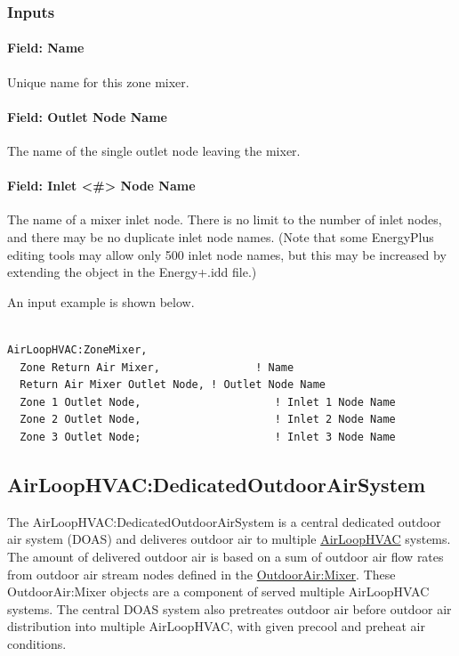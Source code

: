 \subsubsection{Inputs}\label{inputs-5-002}

\paragraph{Field: Name}\label{field-name-5-002}

Unique name for this zone mixer.

\paragraph{Field: Outlet Node Name}\label{field-outlet-node-name-3}

The name of the single outlet node leaving the mixer.

\paragraph{Field: Inlet \textless{}\#\textgreater{} Node Name}\label{field-inlet-node-name-3}

The name of a mixer inlet node. There is no limit to the number of inlet nodes, and there may be no duplicate inlet node names. (Note that some EnergyPlus editing tools may allow only 500 inlet node names, but this may be increased by extending the object in the Energy+.idd file.)

An input example is shown below.

\begin{lstlisting}

AirLoopHVAC:ZoneMixer,
  Zone Return Air Mixer,               ! Name
  Return Air Mixer Outlet Node, ! Outlet Node Name
  Zone 1 Outlet Node,                     ! Inlet 1 Node Name
  Zone 2 Outlet Node,                     ! Inlet 2 Node Name
  Zone 3 Outlet Node;                     ! Inlet 3 Node Name
\end{lstlisting}

\subsection{AirLoopHVAC:DedicatedOutdoorAirSystem}\label{airloophvacdedicatedoutdoorairsystem}

The AirLoopHVAC:DedicatedOutdoorAirSystem is a central dedicated outdoor air system (DOAS) and deliveres outdoor air to multiple \hyperref[airloophvac]{AirLoopHVAC} systems. The amount of delivered outdoor air is based on a sum of outdoor air flow rates from outdoor air stream nodes defined in the \hyperref[outdoorairmixe]{OutdoorAir:Mixer}. These OutdoorAir:Mixer objects are a component of served multiple AirLoopHVAC systems. The central DOAS system also pretreates outdoor air before outdoor air distribution into multiple AirLoopHVAC, with given precool and preheat air conditions.

